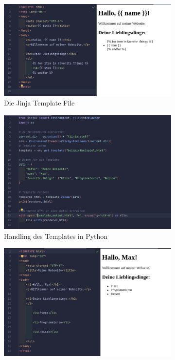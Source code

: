 \documentclass[a4paper, 12pt]{article}
\begin{document}
\begin{figure}[H]
	\hspace*{-2cm}
    \begin{subfigure}{0.6\textwidth}
        \includegraphics[width=\linewidth]{jinja_template.png}
        \caption{Die Jinja Template File}
        \label{fig:jinja_template}
    \end{subfigure}
	\hspace*{1.5cm}
    \begin{subfigure}{0.55\textwidth}
        \includegraphics[width=\linewidth]{jinja_python_code.png}
        \caption{Handling des Templates in Python}
        \label{fig:jinja_python_code}
    \end{subfigure}
	\hspace*{3.5cm}
    \begin{subfigure}{0.6\textwidth}
        \includegraphics[width=\linewidth]{jinja_fertige_html_file.png}

\end{subfigure}
\end{figure}
\end{document}
